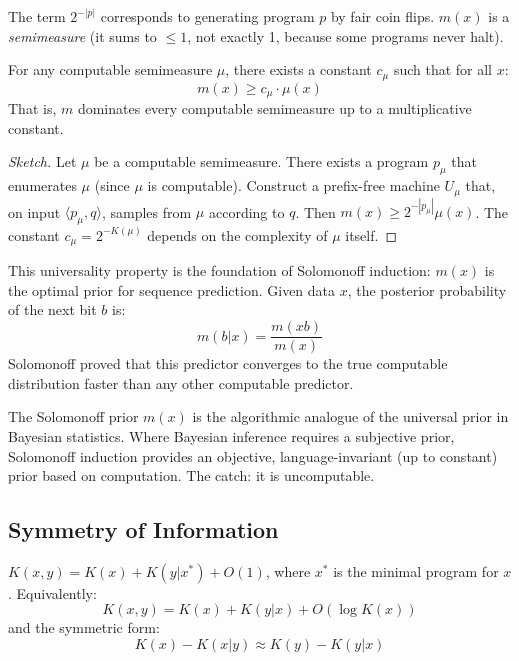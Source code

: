 The term $2^{-|p|}$ corresponds to generating program $p$ by fair coin flips. $m(x)$ is a \emph{semimeasure} (it sums to $\le 1$, not exactly 1, because some programs never halt).

\begin{theorem}[Universality of $m$]
For any computable semimeasure $\mu$, there exists a constant $c_\mu$ such that for all $x$:
\[
m(x) \ge c_\mu \cdot \mu(x)
\]
That is, $m$ dominates every computable semimeasure up to a multiplicative constant.
\end{theorem}

\begin{proof}[Sketch]
Let $\mu$ be a computable semimeasure. There exists a program $p_\mu$ that enumerates $\mu$ (since $\mu$ is computable). Construct a prefix-free machine $U_\mu$ that, on input $\langle p_\mu, q \rangle$, samples from $\mu$ according to $q$. Then $m(x) \ge 2^{-|p_\mu|} \mu(x)$. The constant $c_\mu = 2^{-K(\mu)}$ depends on the complexity of $\mu$ itself.
\end{proof}

This universality property is the foundation of Solomonoff induction: $m(x)$ is the optimal prior for sequence prediction. Given data $x$, the posterior probability of the next bit $b$ is:
\[
m(b | x) = \frac{m(xb)}{m(x)}
\]
Solomonoff proved that this predictor converges to the true computable distribution faster than any other computable predictor.

The Solomonoff prior $m(x)$ is the algorithmic analogue of the universal prior in Bayesian statistics. Where Bayesian inference requires a subjective prior, Solomonoff induction provides an objective, language-invariant (up to constant) prior based on computation. The catch: it is uncomputable.

\subsection{Symmetry of Information}
\label{sec:kolmogorov:symmetry}

\begin{theorem}
\label{thm:symmetry}
$K(x,y) = K(x) + K(y|x^*) + O(1)$, where $x^*$ is the minimal program for $x$.
Equivalently:
\[
K(x,y) = K(x) + K(y|x) + O(\log K(x))
\]
and the symmetric form:
\[
K(x) - K(x|y) \approx K(y) - K(y|x)
\]
\end{theorem}


